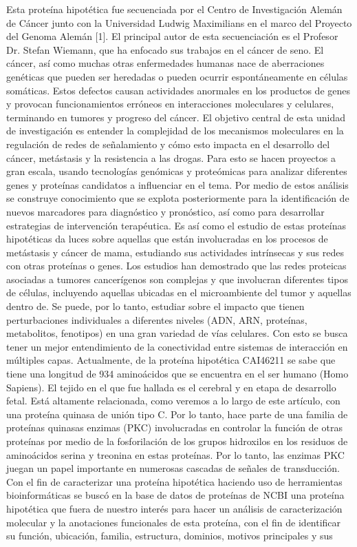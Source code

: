 \documentclass[journal,transmag]{IEEEtran}
\begin{document}
Esta proteína hipotética fue secuenciada por el Centro de Investigación Alemán de Cáncer junto con la Universidad Ludwig Maximilians en el marco del Proyecto del Genoma Alemán [1]. El principal autor de esta secuenciación es el Profesor Dr. Stefan Wiemann, que ha enfocado sus trabajos en el cáncer de seno. El cáncer, así como muchas otras enfermedades humanas nace de aberraciones genéticas que pueden ser heredadas o pueden ocurrir espontáneamente en células somáticas. Estos defectos causan actividades anormales en los productos de genes y provocan funcionamientos erróneos en interacciones moleculares y celulares, terminando en tumores y progreso del cáncer. El objetivo central de esta unidad de investigación es entender la complejidad de los mecanismos moleculares en la regulación de redes de señalamiento y cómo esto impacta en el desarrollo del cáncer, metástasis y la resistencia a las drogas. 
Para esto se hacen proyectos a gran escala, usando tecnologías genómicas y proteómicas para analizar diferentes genes y proteínas candidatos a influenciar en el tema. Por medio de estos análisis se construye conocimiento que se explota posteriormente para la identificación de nuevos marcadores para diagnóstico y pronóstico, así como para desarrollar estrategias de intervención terapéutica. Es así como el estudio de estas proteínas hipotéticas da luces sobre aquellas que están involucradas en los procesos de metástasis y cáncer de mama, estudiando sus actividades intrínsecas y sus redes con otras proteínas o genes. Los estudios han demostrado que las redes proteicas asociadas a tumores cancerígenos son complejas y que involucran diferentes tipos de células, incluyendo aquellas ubicadas en el microambiente del tumor y aquellas dentro de. Se puede, por lo tanto, estudiar sobre el impacto que tienen perturbaciones individuales a diferentes niveles (ADN, ARN, proteínas, metabolitos, fenotipos) en una gran variedad de vías celulares. Con esto se busca tener un mejor entendimiento de la conectividad entre sistemas de interacción en múltiples capas. Actualmente, de la proteína hipotética CAI46211 se sabe que tiene una longitud de 934 aminoácidos que se encuentra en el ser humano (Homo Sapiens). 
El tejido en el que fue hallada es el cerebral y en etapa de desarrollo fetal. Está altamente relacionada, como veremos a lo largo de este artículo, con una proteína quinasa de unión tipo C. Por lo tanto, hace parte de una familia de proteínas quinasas enzimas (PKC) involucradas en controlar la función de otras proteínas por medio de la fosforilación de los grupos hidroxilos en los residuos de aminoácidos serina y treonina en estas proteínas. Por lo tanto, las enzimas PKC juegan un papel importante en numerosas cascadas de señales de transducción. Con el fin de caracterizar una proteína hipotética haciendo uso de herramientas bioinformáticas se buscó en la base de datos de proteínas de NCBI una proteína hipotética que fuera de nuestro interés para hacer un análisis de caracterización molecular y la anotaciones funcionales de esta proteína, con el fin de identificar su función, ubicación, familia, estructura, dominios, motivos principales y sus 
\end{document}
